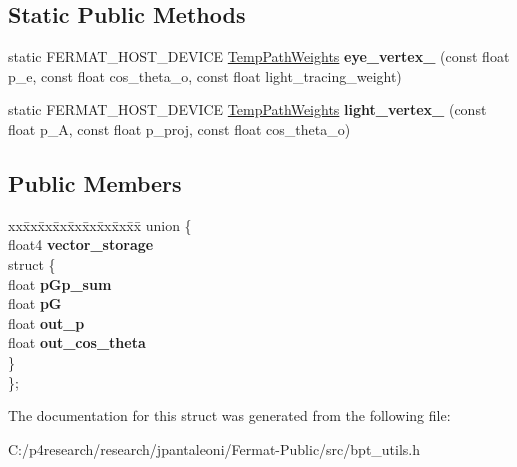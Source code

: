\subsection*{Static Public Methods}
\begin{DoxyCompactItemize}
\item 
\mbox{\label{struct_temp_path_weights_a8986881392b3c49e0056c4cb7eeccfb1}} 
static F\+E\+R\+M\+A\+T\+\_\+\+H\+O\+S\+T\+\_\+\+D\+E\+V\+I\+CE \hyperlink{struct_temp_path_weights}{Temp\+Path\+Weights} {\bfseries eye\+\_\+vertex\+\_} (const float p\+\_\+e, const float cos\+\_\+theta\+\_\+o, const float light\+\_\+tracing\+\_\+weight)
\item 
\mbox{\label{struct_temp_path_weights_a8f9123ca71d52db9eaa2c6607aeef37f}} 
static F\+E\+R\+M\+A\+T\+\_\+\+H\+O\+S\+T\+\_\+\+D\+E\+V\+I\+CE \hyperlink{struct_temp_path_weights}{Temp\+Path\+Weights} {\bfseries light\+\_\+vertex\+\_} (const float p\+\_\+A, const float p\+\_\+proj, const float cos\+\_\+theta\+\_\+o)
\end{DoxyCompactItemize}
\subsection*{Public Members}
\begin{DoxyCompactItemize}
\item 
\mbox{\label{struct_temp_path_weights_aed60d91d4a65e151c25f82bf66c37fcd}} 
\begin{tabbing}
xx\=xx\=xx\=xx\=xx\=xx\=xx\=xx\=xx\=\kill
union \{\\
\>float4 {\bfseries vector\_storage}\\
\mbox{\label{union_temp_path_weights_1_1_0D4_a71014dbca75953413527e4fb4b43c383}} 
\>struct \{\\
\>\>float {\bfseries pGp\_sum}\\
\>\>float {\bfseries pG}\\
\>\>float {\bfseries out\_p}\\
\>\>float {\bfseries out\_cos\_theta}\\
\>\} \\
\}; \\

\end{tabbing}\end{DoxyCompactItemize}


The documentation for this struct was generated from the following file\+:\begin{DoxyCompactItemize}
\item 
C\+:/p4research/research/jpantaleoni/\+Fermat-\/\+Public/src/bpt\+\_\+utils.\+h\end{DoxyCompactItemize}
